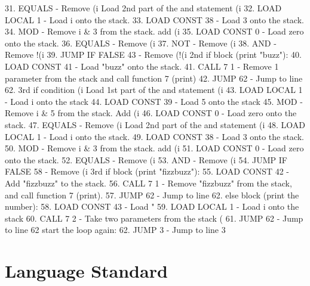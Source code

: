 \documentclass[12pt, letterpaper, oneside]{article}
\begin{document}
{\begin{spverbatim}
			31. EQUALS - Remove (i %
			Load 2nd part of the and statement (i %
			32. LOAD LOCAL 1 - Load i onto the stack.
			33. LOAD CONST 38 - Load 3 onto the stack.
			34. MOD - Remove i & 3 from the stack. add (i %
			35. LOAD CONST 0 - Load zero onto the stack.
			36. EQUALS - Remove (i %
			37. NOT - Remove (i %
			38. AND - Remove !(i %
			39. JUMP IF FALSE 43 - Remove (!(i %
			2nd if block (print "buzz"):
			40. LOAD CONST 41 - Load "buzz" onto the stack.
			41. CALL 7 1 - Remove 1 parameter from the stack and call function 7 (print)
			42. JUMP 62 - Jump to line 62.
			3rd if condition (i %
			Load 1st part of the and statement (i %
			43. LOAD LOCAL 1 - Load i onto the stack
			44. LOAD CONST 39 - Load 5 onto the stack
			45. MOD - Remove i & 5 from the stack. Add (i %
			46. LOAD CONST 0 - Load zero onto the stack.
			47. EQUALS - Remove (i %
			Load 2nd part of the and statement (i %
			48. LOAD LOCAL 1 - Load i onto the stack.
			49. LOAD CONST 38 - Load 3 onto the stack.
			50. MOD - Remove i & 3 from the stack. add (i %
			51. LOAD CONST 0 - Load zero onto the stack.
			52. EQUALS - Remove (i %
			53. AND - Remove (i %
			54. JUMP IF FALSE 58 - Remove (i %
			3rd if block (print "fizzbuzz"):
			55. LOAD CONST 42 - Add "fizzbuzz" to the stack.
			56. CALL 7 1 - Remove "fizzbuzz" from the stack, and call function 7 (print).
			57. JUMP 62 - Jump to line 62.
			else block (print the number):
			58. LOAD CONST 43 - Load "%
			59. LOAD LOCAL 1 - Load i onto the stack
			60. CALL 7 2 - Take two parameters from the stack (%
			61. JUMP 62 - Jump to line 62
			start the loop again:
			62. JUMP 3 - Jump to line 3
		\end{spverbatim} \normalsize}
	\newpage
	
	\renewcommand{\thepage}{\arabic{page}}
	\newpage
	\section{Language Standard}
\end{document}
